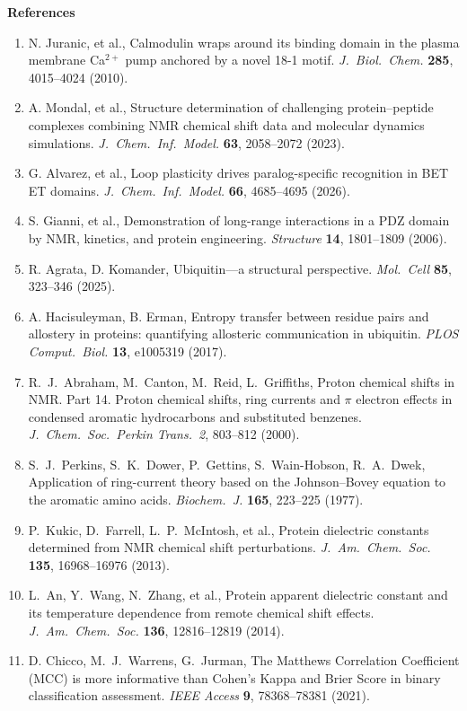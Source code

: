 \documentclass[11pt]{article}
\begin{document}
\begin{center}
{\LARGE\bfseries References}
\end{center}

\vspace{0.4em}
\begin{enumerate}
\item N. Juranic, et al., Calmodulin wraps around its binding domain in the
plasma membrane Ca$^{2+}$ pump anchored by a novel 18-1 motif.
\textit{J.\ Biol.\ Chem.} \textbf{285}, 4015--4024 (2010).
\item A. Mondal, et al., Structure determination of challenging protein--peptide
complexes combining NMR chemical shift data and molecular dynamics simulations.
\textit{J.\ Chem.\ Inf.\ Model.} \textbf{63}, 2058--2072 (2023).
\item G. Alvarez, et al., Loop plasticity drives paralog-specific recognition
in BET ET domains.
\textit{J.\ Chem.\ Inf.\ Model.} \textbf{66}, 4685--4695 (2026).
\item S. Gianni, et al., Demonstration of long-range interactions in a PDZ
domain by NMR, kinetics, and protein engineering.
\textit{Structure} \textbf{14}, 1801--1809 (2006).
\item R. Agrata, D. Komander, Ubiquitin---a structural perspective.
\textit{Mol.\ Cell} \textbf{85}, 323--346 (2025).
\item A. Hacisuleyman, B. Erman, Entropy transfer between residue pairs and
allostery in proteins: quantifying allosteric communication in ubiquitin.
\textit{PLOS Comput.\ Biol.} \textbf{13}, e1005319 (2017).
\item R.\ J.\ Abraham, M.\ Canton, M.\ Reid, L.\ Griffiths, Proton chemical
shifts in NMR. Part 14. Proton chemical shifts, ring currents and $\pi$
electron effects in condensed aromatic hydrocarbons and substituted benzenes.
\textit{J.\ Chem.\ Soc.\ Perkin Trans.\ 2}, 803--812 (2000).
\item S.\ J.\ Perkins, S.\ K.\ Dower, P.\ Gettins, S.\ Wain-Hobson,
R.\ A.\ Dwek, Application of ring-current theory based on the Johnson--Bovey
equation to the aromatic amino acids.
\textit{Biochem.\ J.} \textbf{165}, 223--225 (1977).
\item P.\ Kukic, D.\ Farrell, L.\ P.\ McIntosh, et al., Protein dielectric
constants determined from NMR chemical shift perturbations.
\textit{J.\ Am.\ Chem.\ Soc.} \textbf{135}, 16968--16976 (2013).
\item L.\ An, Y.\ Wang, N.\ Zhang, et al., Protein apparent dielectric constant
and its temperature dependence from remote chemical shift effects.
\textit{J.\ Am.\ Chem.\ Soc.} \textbf{136}, 12816--12819 (2014).
\item D. Chicco, M.\ J.\ Warrens, G.\ Jurman, The Matthews Correlation
Coefficient (MCC) is more informative than Cohen's Kappa and Brier Score in
binary classification assessment.
\textit{IEEE Access} \textbf{9}, 78368--78381 (2021).
\end{enumerate}
\end{document}
